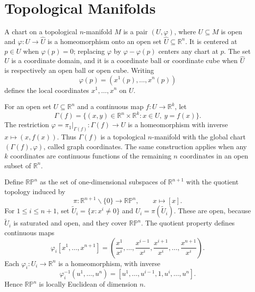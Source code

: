 

\section{Topological Manifolds}

\begin{definition}
\label{def:1-extra-2}
\mathlibok
A chart on a topological $n$-manifold $M$ is a pair $(U,\varphi)$, where
$U\subseteq M$ is open and $\varphi:U\to\widehat U$ is a homeomorphism onto
an open set $\widehat U\subseteq\mathbb R^n$. It is centered at $p\in U$ when
$\varphi(p)=0$; replacing $\varphi$ by $\varphi-\varphi(p)$ centers any chart
at $p$. The set $U$ is a coordinate domain, and it is a coordinate ball or
coordinate cube when $\widehat U$ is respectively an open ball or open cube.
Writing
\[
\varphi(p)=(x^1(p),\ldots,x^n(p))
\]
defines the local coordinates $x^1,\ldots,x^n$ on $U$.
\end{definition}

\begin{example}
\label{ex:1-3}
\leanok
{}
For an open set $U\subseteq\mathbb R^n$ and a continuous map
$f:U\to\mathbb R^k$, let
\[
\Gamma(f)=\{(x,y)\in\mathbb R^n\times\mathbb R^k:x\in U,\ y=f(x)\}.
\]
The restriction $\varphi=\pi_1|_{\Gamma(f)}:\Gamma(f)\to U$ is a
homeomorphism with inverse $x\mapsto(x,f(x))$. Thus $\Gamma(f)$ is a
topological $n$-manifold with the global chart $(\Gamma(f),\varphi)$, called
graph coordinates. The same construction applies when any $k$ coordinates
are continuous functions of the remaining $n$ coordinates in an open subset
of $\mathbb R^n$.
\end{example}

\begin{example}
\label{ex:1-5}
\leanok
{}
Define $\mathbb{RP}^n$ as the set of one-dimensional subspaces of
$\mathbb R^{n+1}$ with the quotient topology induced by
\[
\pi:\mathbb R^{n+1}\smallsetminus\{0\}\to\mathbb{RP}^n,
\qquad x\mapsto[x].
\]
For $1\leq i\leq n+1$, set
$\widetilde U_i=\{x:x^i\neq0\}$ and $U_i=\pi(\widetilde U_i)$. These are open,
because $\widetilde U_i$ is saturated and open, and they cover
$\mathbb{RP}^n$. The quotient property defines continuous maps
\[
\varphi_i[x^1,\ldots,x^{n+1}]
=\left(\frac{x^1}{x^i},\ldots,\frac{x^{i-1}}{x^i},
\frac{x^{i+1}}{x^i},\ldots,\frac{x^{n+1}}{x^i}\right).
\]
Each $\varphi_i:U_i\to\mathbb R^n$ is a homeomorphism, with inverse
\[
\varphi_i^{-1}(u^1,\ldots,u^n)
=[u^1,\ldots,u^{i-1},1,u^i,\ldots,u^n].
\]
Hence $\mathbb{RP}^n$ is locally Euclidean of dimension $n$.
\end{example}

